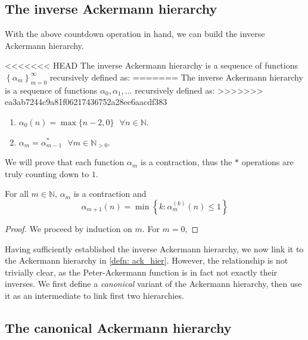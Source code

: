 \subsection{The inverse Ackermann hierarchy}

With the above countdown operation in hand, we can 
build the inverse Ackermann hierarchy.

\begin{defn} \label{defn: inv_ack_hier}
<<<<<<< HEAD
The inverse Ackermann hierarchy is a sequence of functions $\left\{\alpha_m\right\}_{m=0}^\infty$ recursively defined as:
=======
The inverse Ackermann hierarchy is a sequence of 
functions $\alpha_0, \alpha_1, \ldots $ recursively defined as:
>>>>>>> ea3ab7244c9a81f06217436752a28ec6aacdf383
\begin{enumerate}
	\item $\alpha_0(n) = \max\{n-2, 0\} \ \ \ \forall n \in \mathbb{N}$.
	\item $\alpha_m = \alpha_{m-1}^*  \ \ \ \forall m\in \mathbb{N}_{>0}$.
\end{enumerate}
\end{defn}

We will prove that each function $\alpha_m$ is a contraction, 
thus the $*$ operations are truly counting down to $1$.

\begin{thm} \label{thm: inv_ack_countdown}
For all $m\in\mathbb{N}$, $\alpha_m$ is a contraction and
\begin{equation}
\alpha_{m+1}(n) = \min\left\{ k : \alpha_m^{(k)}(n) \le 1 \right\}
\end{equation}
\end{thm}

\begin{proof}
We proceed by induction on $m$. For $m = 0$, 
\end{proof}

Having sufficiently established the inverse Ackermann 
hierarchy, we now link it to the Ackermann hierarchy 
in \cref{defn: ack_hier}. However, the relationship is 
not trivially clear, as the Peter-Ackermann function is 
in fact not exactly {\color{magenta}their inverses.} 
We first define a \textit{canonical} variant of the 
Ackermann hierarchy, then use it as an intermediate to 
link first two hierarchies.

\subsection{The canonical Ackermann hierarchy}

